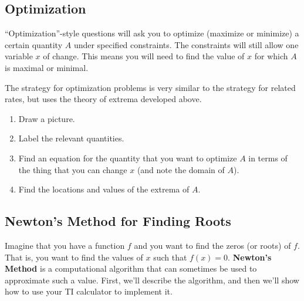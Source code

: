 

\subsection{Optimization}

``Optimization''-style questions will ask you to optimize (maximize or minimize) a certain quantity $A$ under specified constraints. The constraints will still allow one variable $x$ of change. This means you will need to find the value of $x$ for which $A$ is maximal or minimal. 

The strategy for optimization problems is very similar to the strategy for related rates, but uses the theory of extrema developed above.

\begin{strat}[Optimization]
\begin{enumerate}[leftmargin=1em]
\item Draw a picture.
\item Label the relevant quantities.
\item Find an equation for the quantity that you want to optimize $A$ in terms of the thing that you can change $x$ (and note the domain of $A$).
\item Find the locations and values of the extrema of $A$.
\end{enumerate}
\end{strat}


\subsection{Newton's Method for Finding Roots}

Imagine that you have a function $f$ and you want to find the zeros (or roots) of $f$. That is, you want to find the values of $x$ such that $f(x)=0$. \textbf{Newton's Method} is a computational algorithm that can sometimes be used to approximate such a value. First, we'll describe the algorithm, and then we'll show how to use your TI calculator to implement it.

